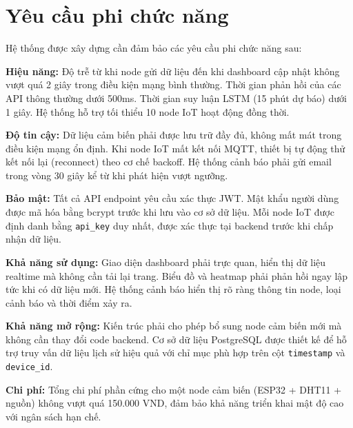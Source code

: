 \section{Yêu cầu phi chức năng}
\label{sec:survey:nonfunc}

Hệ thống được xây dựng cần đảm bảo các yêu cầu phi chức năng sau:

\textbf{Hiệu năng:} Độ trễ từ khi node gửi dữ liệu đến khi dashboard
cập nhật không vượt quá 2 giây trong điều kiện mạng bình thường. Thời
gian phản hồi của các API thông thường dưới 500ms. Thời gian suy luận
LSTM (15 phút dự báo) dưới 1 giây. Hệ thống hỗ trợ tối thiểu 10 node
IoT hoạt động đồng thời.

\textbf{Độ tin cậy:} Dữ liệu cảm biến phải được lưu trữ đầy đủ, không
mất mát trong điều kiện mạng ổn định. Khi node IoT mất kết nối MQTT,
thiết bị tự động thử kết nối lại (reconnect) theo cơ chế backoff. Hệ
thống cảnh báo phải gửi email trong vòng 30 giây kể từ khi phát hiện
vượt ngưỡng.

\textbf{Bảo mật:} Tất cả API endpoint yêu cầu xác thực JWT. Mật khẩu
người dùng được mã hóa bằng bcrypt trước khi lưu vào cơ sở dữ liệu.
Mỗi node IoT được định danh bằng \texttt{api\_key} duy nhất, được xác
thực tại backend trước khi chấp nhận dữ liệu.

\textbf{Khả năng sử dụng:} Giao diện dashboard phải trực quan, hiển thị
dữ liệu realtime mà không cần tải lại trang. Biểu đồ và heatmap phải
phản hồi ngay lập tức khi có dữ liệu mới. Hệ thống cảnh báo hiển thị
rõ ràng thông tin node, loại cảnh báo và thời điểm xảy ra.

\textbf{Khả năng mở rộng:} Kiến trúc phải cho phép bổ sung node cảm
biến mới mà không cần thay đổi code backend. Cơ sở dữ liệu PostgreSQL
được thiết kế để hỗ trợ truy vấn dữ liệu lịch sử hiệu quả với chỉ mục
phù hợp trên cột \texttt{timestamp} và \texttt{device\_id}.

\textbf{Chi phí:} Tổng chi phí phần cứng cho một node cảm biến (ESP32 +
DHT11 + nguồn) không vượt quá 150.000 VND, đảm bảo khả năng triển khai
mật độ cao với ngân sách hạn chế.
